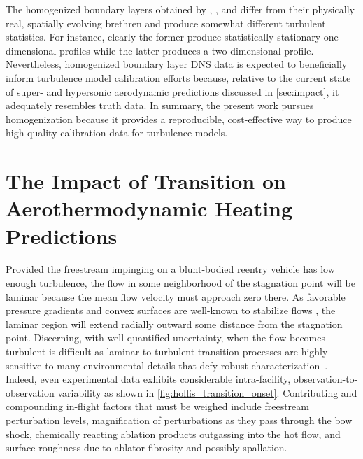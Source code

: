 The homogenized boundary layers obtained by \citeauthor{Spalart1988Direct},
\citeauthor{Guarini1998}, and \citeauthor{Topalian2014Spatiotemporal} differ
from their physically real, spatially evolving brethren and produce somewhat
different turbulent statistics.  For instance, clearly the former produce
statistically stationary one-dimensional profiles while the latter produces a
two-dimensional profile.  Nevertheless, homogenized boundary layer DNS data is
expected to beneficially inform turbulence model calibration efforts because,
relative to the current state of super- and hypersonic aerodynamic predictions
discussed in \autoref{sec:impact}, it adequately resembles truth data.  In
summary, the present work pursues homogenization because it provides a
reproducible, cost-effective way to produce high-quality calibration data for
turbulence models.

\section[The Impact of Transition on Aerothermodynamic Heating Predictions]
        {The Impact of Transition on\\Aerothermodynamic Heating Predictions}
\label{sec:transition}

Provided the freestream impinging on a blunt-bodied reentry vehicle has low enough
turbulence, the flow in some neighborhood of the stagnation point will be laminar
because the mean flow velocity must approach zero there.  As favorable pressure
gradients and convex surfaces are well-known to stabilize flows \citep[see,
e.g.,][]{Luker2000Influence,Thomann1968Effect,Arnette1998Effects}, the laminar
region will extend radially outward some distance from the stagnation point.
Discerning, with well-quantified uncertainty, when the flow becomes turbulent is
difficult as laminar-to-turbulent transition processes are highly sensitive
to many environmental details that defy robust
characterization~\citep{Federov2011Transition}.  Indeed, even experimental data
exhibits considerable intra-facility,
observation-to-observation variability as shown in
\autoref{fig:hollis_transition_onset}.  Contributing and compounding in-flight
factors that must be weighed include freestream perturbation levels,
magnification of perturbations as they pass through the bow shock,
chemically reacting ablation products outgassing into the hot flow, and surface
roughness due to ablator fibrosity and possibly spallation.

